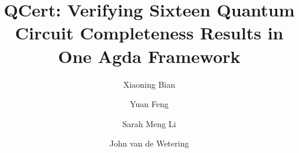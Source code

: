 \documentclass[acmsmall,nonacm,11pt,screen]{acmart}
\begin{document}
\title[QCert: Verifying Sixteen Quantum Circuit Completeness Results in One Agda Framework]{QCert: Verifying Sixteen Quantum Circuit Completeness Results in One Agda Framework}

\vspace{-.2 cm}

\author[Xiaoning Bian]{Xiaoning Bian}
\author[Yuan Feng]{Yuan Feng}
\author[Sarah Meng Li]{Sarah Meng Li}
\author[John van de Wetering]{John van de Wetering}
\authorsaddresses{}



\maketitle
\renewcommand{\shortauthors}{}
\renewcommand{\shorttitle}{}
\vspace{-.2 cm}
\end{document}
